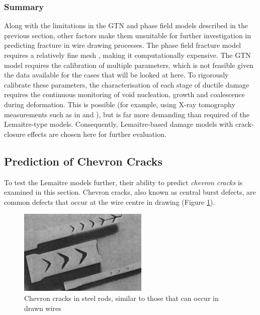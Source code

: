 \documentclass[sn-mathphys,Numbered]{sn-jnl}%
\begin{document}
\subsubsection{Summary}
Along with the limitations in the GTN and phase field models described in the previous section, other factors make them unsuitable for further investigation in predicting fracture in wire drawing processes.
The phase field fracture model requires a relatively fine mesh \cite{borden_phase-field_2016}, making it computationally expensive. The GTN model requires the calibration of multiple parameters, which is not feasible given the data available for the cases that will be looked at here.
To rigorously calibrate these parameters, the characterisation of each stage of ductile damage requires the continuous monitoring of void nucleation, growth and coalescence during deformation.
This is possible (for example, using X-ray tomography measurements such as in \citet{thuillier_ductile_2012} and \citet{fansi_numerical_2013}), but is far more demanding than required of the Lemaitre-type models.
Consequently, Lemaitre-based damage models with crack-closure effects are chosen here for further evaluation.


\subsection{Prediction of Chevron Cracks}
To test the Lemaitre models further, their ability to predict \emph{chevron cracks} is examined in this section.
Chevron cracks, also known as central burst defects, are common defects that occur at the wire centre in drawing (Figure \ref{fig:chevronCracks}).
\begin{figure}[htb]
\begin{center}
	\includegraphics[width=0.55\textwidth]{./Figures/finiteVolumeCharacteristics/chevronCracked.png}
	\caption{Chevron cracks in steel rods, similar to those that can occur in drawn wires \cite{krauss_steels_2015}}
	\label{fig:chevronCracks}
\end{center}
\end{figure}
\end{document}

